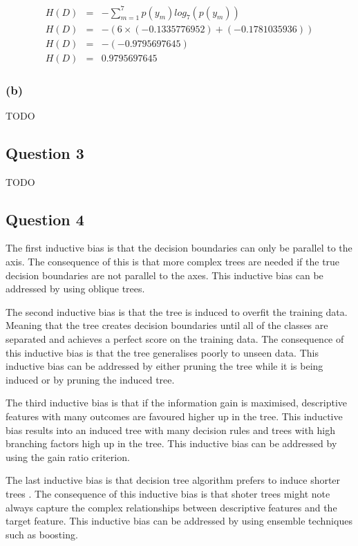 \documentclass[10pt]{article}
\begin{document}
\begin{eqnarray*}
    H(D) &=& - \sum_{m=1}^{7} p(y_m) log_7 \left( p(y_m) \right) \\
    H(D) &=& - \left( 6\times(-0.1335776952) + (-0.1781035936) \right) \\
    H(D) &=& - (-0.9795697645) \\
    H(D) &=& 0.9795697645
\end{eqnarray*}

\subsubsection*{(b)}

TODO

\subsection*{Question 3}

TODO

\subsection*{Question 4}

The first inductive bias is that the decision boundaries can only be parallel to the axis. The
consequence of this is that more complex trees are needed if the true decision boundaries are not
parallel to the axes. This inductive bias can be addressed by using oblique trees.

The second inductive bias is that the tree is induced to overfit the training data. Meaning that
the tree creates decision boundaries until all of the classes are separated and achieves a
perfect score on the training data. The consequence of this inductive bias is that the
tree generalises poorly to unseen data. This inductive bias can be addressed by either pruning the
tree while it is being induced or by pruning the induced tree.

The third inductive bias is that if the information gain is maximised, descriptive features with many
outcomes are favoured higher up in the tree. This inductive bias results into an induced tree with many decision
rules and trees with high branching factors high up in the tree. This inductive bias can be addressed by using
the gain ratio criterion.

The last inductive bias is that decision tree algorithm prefers to induce shorter trees \cite{sectionB-Q4}. The consequence
of this inductive bias is that shoter trees might note always capture the complex relationships between
descriptive features and the target feature. This inductive bias can be addressed by using ensemble techniques
such as boosting.
\end{document}
